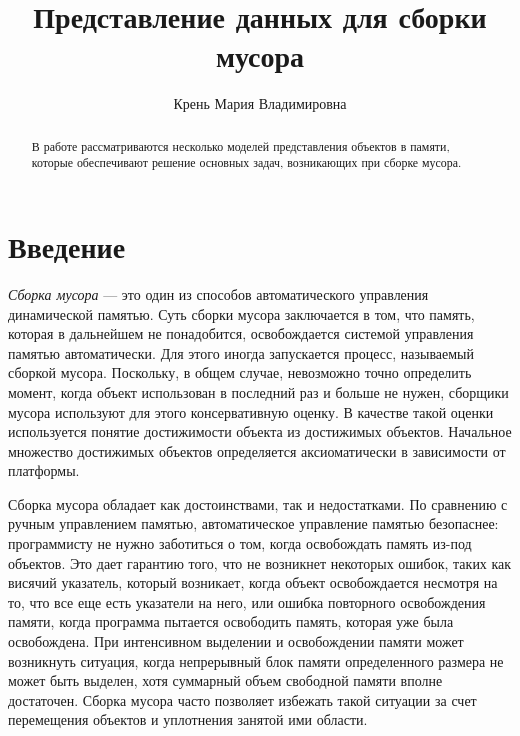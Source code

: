 \title{Представление данных для сборки мусора}
%
\author{Крень Мария Владимировна}
%
%
%

\maketitle              %

\begin{abstract}
В работе рассматриваются несколько моделей представления объектов
в памяти, которые обеспечивают решение основных задач, возникающих
при сборке мусора.
\end{abstract}
%

\section*{Введение}

\emph{Сборка мусора} --- это один из способов автоматического управления динамической памятью.
Суть сборки мусора заключается в том, что память, которая в дальнейшем не понадобится, освобождается системой управления памятью автоматически. 
Для этого иногда запускается процесс, называемый сборкой  мусора.
Поскольку, в общем случае, невозможно точно определить момент, когда объект использован в последний раз и
больше не нужен, сборщики мусора используют для этого консервативную оценку.
В качестве такой оценки используется понятие достижимости объекта из достижимых объектов. 
Начальное множество достижимых объектов определяется аксиоматически в зависимости от платформы.

Сборка мусора обладает как достоинствами, так и недостатками.
По сравнению с ручным управлением памятью, автоматическое управление памятью безопаснее: программисту не нужно 
заботиться о том, когда освобождать память из-под объектов. 
Это дает гарантию того, что не возникнет некоторых ошибок, таких как
висячий указатель, который возникает, когда объект освобождается несмотря на то, 
что все еще есть
указатели на него, или ошибка повторного освобождения памяти, 
когда программа пытается освободить память, которая уже  была освобождена.
При интенсивном выделении и освобождении памяти может возникнуть ситуация,
когда непрерывный блок памяти определенного размера не может быть выделен,
хотя суммарный объем свободной памяти вполне достаточен. Сборка мусора часто позволяет избежать такой
ситуации за счет перемещения объектов и уплотнения занятой ими области.

